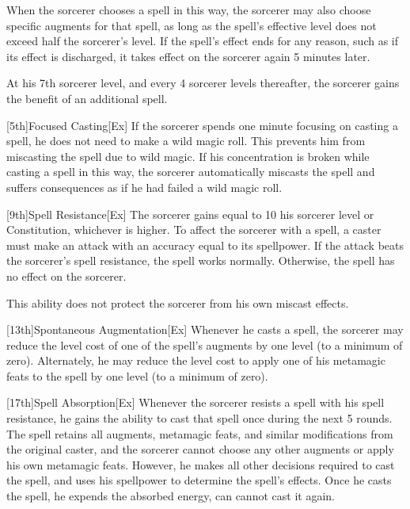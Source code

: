         When the sorcerer chooses a spell in this way, the sorcerer may also choose specific augments for that spell, as long as the spell's effective level does not exceed half the sorcerer's level.
        If the spell's effect ends for any reason, such as if its effect is discharged, it takes effect on the sorcerer again 5 minutes later.

        At his 7th sorcerer level, and every 4 sorcerer levels thereafter, the sorcerer gains the benefit of an additional spell.

        [5th]{Focused Casting}[Ex]
        If the sorcerer spends one minute focusing on casting a spell, he does not need to make a wild magic roll.
        This prevents him from miscasting the spell due to wild magic.
        If his concentration is broken while casting a spell in this way, the sorcerer automatically miscasts the spell and suffers consequences as if he had failed a wild magic roll.

        [9th]{Spell Resistance}[Ex]
        The sorcerer gains  equal to 10 \add his sorcerer level or Constitution, whichever is higher.
        To affect the sorcerer with a spell, a caster must make an attack with an accuracy equal to its spellpower.
        If the attack beats the sorcerer's spell resistance, the spell works normally.
        Otherwise, the spell has no effect on the sorcerer.

        This ability does not protect the sorcerer from his own miscast effects.

        [13th]{Spontaneous Augmentation}[Ex]
        Whenever he casts a spell, the sorcerer may reduce the level cost of one of the spell's augments by one level (to a minimum of zero).
        Alternately, he may reduce the level cost to apply one of his metamagic feats to the spell by one level (to a minimum of zero).

        [17th]{Spell Absorption}[Ex]
        Whenever the sorcerer resists a spell with his spell resistance, he gains the ability to cast that spell once during the next 5 rounds.
        The spell retains all augments, metamagic feats, and similar modifications from the original caster, and the sorcerer cannot choose any other augments or apply his own metamagic feats.
        However, he makes all other decisions required to cast the spell, and uses his spellpower to determine the spell's effects.
        Once he casts the spell, he expends the absorbed energy, can cannot cast it again.


